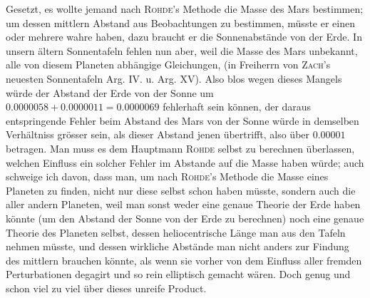 Gesetzt, es wollte jemand nach \textsc{Rohde}'s Methode die Masse des Mars bestimmen; um dessen mittlern Abstand aus Beobachtungen zu bestimmen, müsste er einen oder mehrere wahre haben, dazu braucht er die Sonnenabstände von der Erde. In unsern ältern Sonnentafeln fehlen nun aber, weil die Masse des Mars unbekannt, alle von diesem Planeten abhängige Gleichungen, (in Freiherrn von \textsc{Zach}'s neuesten Sonnentafeln Arg. IV. u. Arg. XV). Also blos wegen dieses Mangels würde der Abstand der Erde von der Sonne um $0.0000058 + 0.0000011 = 0.0000069$ fehlerhaft sein können, der daraus entspringende Fehler beim Abstand des Mars von der Sonne würde in demselben Verhältniss grösser sein, als dieser Abstand jenen übertrifft, also über $0.00001$ betragen. Man muss es dem Hauptmann \textsc{Rohde} selbst zu berechnen überlassen, welchen Einfluss ein solcher Fehler im Abstande auf die Masse haben würde; auch schweige ich davon, dass man, um nach \textsc{Rohde}'s Methode die Masse eines Planeten zu finden, nicht nur diese selbst schon haben müsste, sondern auch die aller andern Planeten, weil man sonst weder eine genaue Theorie der Erde haben könnte (um den Abstand der Sonne von der Erde zu berechnen) noch eine genaue Theorie des Planeten selbst, dessen heliocentrische Länge man aus den Tafeln nehmen müsste, und dessen wirkliche Abstände man nicht anders zur Findung des mittlern brauchen könnte, als wenn sie vorher von dem Einfluss aller fremden Perturbationen degagirt und so rein elliptisch gemacht wären. Doch genug und schon viel zu viel über dieses unreife Product.
